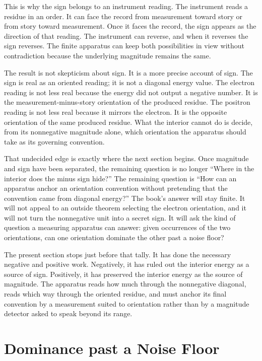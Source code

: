 This is why the sign belongs to an instrument reading. The instrument reads a
residue in an order. It can face the record from measurement toward story or
from story toward measurement. Once it faces the record, the sign appears as
the direction of that reading. The instrument can reverse, and when it reverses
the sign reverses. The finite apparatus can keep both possibilities in view
without contradiction because the underlying magnitude remains the same.

The result is not skepticism about sign. It is a more precise account of sign.
The sign is real as an oriented reading; it is not a diagonal energy value. The
electron reading is not less real because the energy did not output a negative
number. It is the measurement-minus-story orientation of the produced residue.
The positron reading is not less real because it mirrors the electron. It is
the opposite orientation of the same produced residue. What the interior cannot
do is decide, from its nonnegative magnitude alone, which orientation the
apparatus should take as its governing convention.

That undecided edge is exactly where the next section begins. Once magnitude
and sign have been separated, the remaining question is no longer ``Where in
the interior does the minus sign hide?'' The remaining question is ``How can an
apparatus anchor an orientation convention without pretending that the
convention came from diagonal energy?'' The book's answer will stay finite. It
will not appeal to an outside theorem selecting the electron orientation, and
it will not turn the nonnegative unit into a secret sign. It will ask the kind
of question a measuring apparatus can answer: given occurrences of the two
orientations, can one orientation dominate the other past a noise floor?

The present section stops just before that tally. It has done the necessary
negative and positive work. Negatively, it has ruled out the interior energy as
a source of sign. Positively, it has preserved the interior energy as the
source of magnitude. The apparatus reads how much through the nonnegative
diagonal, reads which way through the oriented residue, and must anchor its
final convention by a measurement suited to orientation rather than by a
magnitude detector asked to speak beyond its range.

\section{Dominance past a Noise Floor}

